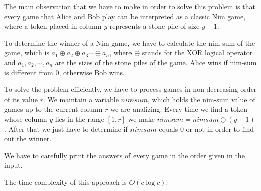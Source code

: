 % 

The main observation that we have to make in order to solve this problem is that every game that Alice and Bob play can be interpreted as a classic Nim game, where a token placed in column $y$ represents a stone pile of size $y - 1$.

To determine the winner of a Nim game, we have to calculate the nim-sum of the game, which is $a_1 \oplus a_2 \oplus a_3 \cdots \oplus a_n$, where $\oplus$ stands for the XOR logical operator and $a_1, a_2, \cdots, a_n$ are the sizes of the stone piles of the game. Alice wins if nim-sum is different from $0$, otherwise Bob wins.

To solve the problem efficiently, we have to process games in non decreasing order of its value $r$. We maintain a variable $nimsum$, which holds the nim-sum value of games up to the current column $r$ we are analizing. Every time we find a token whose column $y$ lies in the range $[1, r]$ we make $nimsum = nimsum \oplus (y - 1)$. After that we just have to determine if $nimsum$ equals $0$ or not in order to find out the winner.

We have to carefully print the answers of every game in the order given in the input.

The time complexity of this approach is $O(c \log c)$.